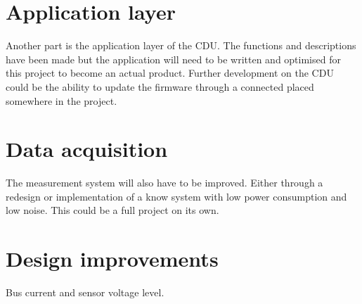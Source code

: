 \section{Application layer}
Another part is the application layer of the CDU. The functions and descriptions have been made but the application will need to be written and optimised for this project to become an actual product. Further development on the CDU could be the ability to update the firmware through a connected placed somewhere in the project.

\section{Data acquisition}
The measurement system will also have to be improved. Either through a redesign or implementation of a know system with low power consumption and low noise. This could be a full project on its own.

\section{Design improvements}
Bus current and sensor voltage level.
